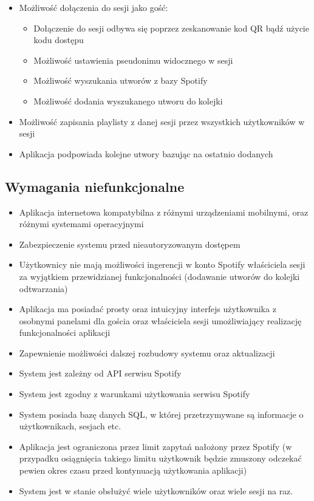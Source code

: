 \begin{itemize}
	\item Możliwość dołączenia do sesji jako gość: 
	\begin{itemize}
		\item Dołączenie do sesji odbywa się poprzez zeskanowanie kod QR bądź użycie kodu dostępu 
		\item Możliwość ustawienia pseudonimu widocznego w sesji 
		\item Możliwość wyszukania utworów z bazy Spotify 
		\item Możliwość dodania wyszukanego utworu do kolejki
	\end{itemize}
	
	\item Możliwość zapisania playlisty z danej sesji przez wszystkich użytkowników w sesji
	\item Aplikacja podpowiada kolejne utwory bazując na ostatnio dodanych 
\end{itemize}

\subsection{Wymagania niefunkcjonalne}
\begin{itemize}
	\item Aplikacja internetowa kompatybilna z różnymi urządzeniami mobilnymi, oraz różnymi systemami operacyjnymi
	\item Zabezpieczenie systemu przed nieautoryzowanym dostępem
	\item Użytkownicy nie mają możliwości ingerencji w konto Spotify właściciela sesji za wyjątkiem przewidzianej funkcjonalności (dodawanie utworów do kolejki odtwarzania)
	\item Aplikacja ma posiadać prosty oraz intuicyjny interfejs użytkownika z osobnymi panelami dla gościa oraz właściciela sesji umożliwiający realizację funkcjonalności aplikacji
	\item Zapewnienie możliwości dalszej rozbudowy systemu oraz aktualizacji
	\item System jest zależny od API serwisu Spotify
	\item System jest zgodny z warunkami użytkowania serwisu Spotify \cite{bib:spotify_terms}
	\item System posiada bazę danych SQL, w której przetrzymywane są informacje o użytkownikach, sesjach etc. 
	\item Aplikacja jest ograniczona przez limit zapytań nałożony przez Spotify (w przypadku osiągnięcia takiego limitu użytkownik będzie zmuszony odczekać pewien okres czasu przed kontynuacją użytkowania aplikacji)
	\item System jest w stanie obsłużyć wiele użytkowników oraz wiele sesji na raz.
\end{itemize}

